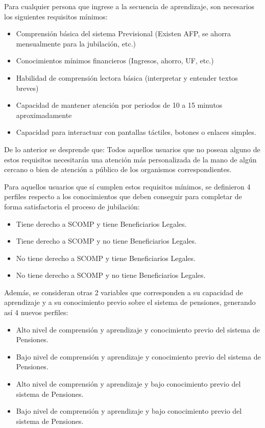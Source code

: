
\renewcommand{\arraystretch}{1.5}

Para cualquier persona que ingrese a la secuencia de aprendizaje, son necesarios los siguientes requisitos mínimos: 
\begin{itemize}
    \item Comprensión básica del sistema Previsional (Existen AFP, se ahorra mensualmente para la jubilación, etc.) 
    \item Conocimientos mínimos financieros (Ingresos, ahorro, UF, etc.)
    \item Habilidad de comprensión lectora básica (interpretar y entender textos breves)
    \item Capacidad de mantener atención por periodos de 10 a 15 minutos aproximadamente
    \item Capacidad para interactuar con pantallas táctiles, botones o enlaces simples.
\end{itemize}

De lo anterior se desprende que: Todos aquellos usuarios que no posean alguno de estos requisitos necesitarán una atención más personalizada de la mano de algún cercano o bien de atención a público de los organismos correspondientes. 

Para aquellos usuarios que sí cumplen estos requisitos mínimos, se definieron 4 perfiles respecto a los conocimientos que deben conseguir para completar de forma satisfactoria el proceso de jubilación:
\begin{itemize}
    \item Tiene derecho a SCOMP y tiene Beneficiarios Legales.
    \item Tiene derecho a SCOMP y no tiene Beneficiarios Legales.  
    \item No tiene derecho a SCOMP y tiene Beneficiarios Legales. 
    \item No tiene derecho a SCOMP y no tiene Beneficiarios Legales. 
\end{itemize}

Además, se consideran otras 2 variables que corresponden a su capacidad de aprendizaje y a su conocimiento previo sobre el sistema de pensiones, generando así 4 nuevos perfiles: 
\begin{itemize}
    \item Alto nivel de comprensión y aprendizaje y conocimiento previo del sistema de Pensiones. 
    \item Bajo nivel de comprensión y aprendizaje y conocimiento previo del sistema de Pensiones. 
    \item Alto nivel de comprensión y aprendizaje y bajo conocimiento previo del sistema de Pensiones. 
    \item Bajo nivel de comprensión y aprendizaje y bajo conocimiento previo del sistema de Pensiones. 
\end{itemize}

